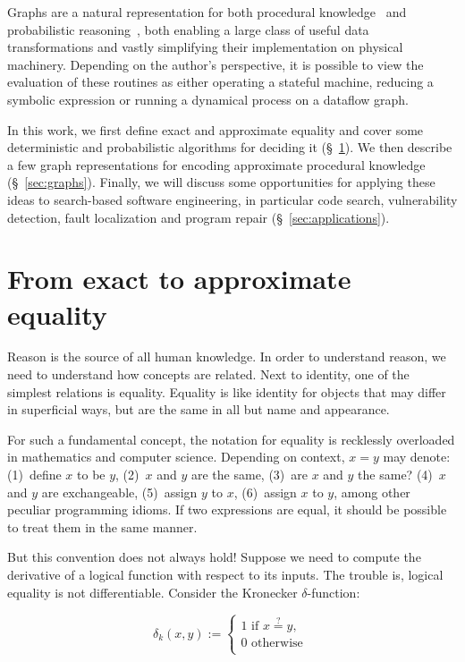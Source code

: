 \documentclass[11pt]{article}
\begin{document}
    Graphs are a natural representation for both procedural knowledge~\citep{allamanis2017learning} and probabilistic reasoning~\citep{pearl2014probabilistic}, both enabling a large class of useful data transformations and vastly simplifying their implementation on physical machinery. Depending on the author's perspective, it is possible to view the evaluation of these routines as either operating a stateful machine, reducing a symbolic expression or running a dynamical process on a dataflow graph.

    In this work, we first  define exact and approximate equality and cover some deterministic and probabilistic algorithms for deciding it (\S~\ref{sec:definitions}). We then describe a few graph representations for encoding approximate procedural knowledge (\S~\ref{sec:graphs}). Finally, we will discuss some opportunities for applying these ideas to search-based software engineering, in particular code search, vulnerability detection, fault localization and program repair (\S~\ref{sec:applications}).


    \section{From exact to approximate equality}\label{sec:definitions}

    Reason is the source of all human knowledge. In order to understand reason, we need to understand how concepts are related. Next to identity, one of the simplest relations is equality. Equality is like identity for objects that may differ in superficial ways, but are the same in all but name and appearance.

    For such a fundamental concept, the notation for equality is recklessly overloaded in mathematics and computer science. Depending on context, $x = y$ may denote: (1)~define $x$ to be $y$, (2)~$x$ and $y$ are the same, (3)~are $x$ and $y$ the same? (4)~$x$ and $y$ are exchangeable, (5)~assign $y$ to $x$, (6)~assign $x$ to $y$, among other peculiar programming idioms. If two expressions are equal, it should be possible to treat them in the same manner.

    But this convention does not always hold! Suppose we need to compute the derivative of a logical function with respect to its inputs. The trouble is, logical equality is not differentiable. Consider the Kronecker $δ$-function: %

    $$
    δ_k(x, y) :=
    \begin{cases}
        1 \text{ if } x \overset{?}{=} y, \\
        0 \text{ otherwise }\\
    \end{cases}
    $$
\end{document}
